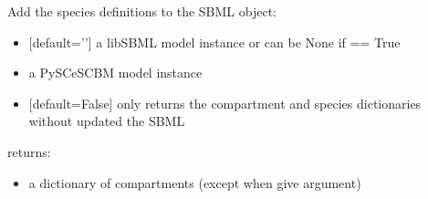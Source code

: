 \documentclass[letterpaper,10pt,english]{sphinxmanual}
\begin{document}
\begin{fulllineitems}
\label{\detokenize{modules_doc:cbmpy.CBXML.sbml_setSpeciesL2}}
\pysigstartsignatures
{}
\pysigstopsignatures
\sphinxAtStartPar
Add the species definitions to the SBML object:
\begin{itemize}
\item {} 
\sphinxAtStartPar
{} {[}default=’’{]} a libSBML model instance or can be None if  == True

\item {} 
\sphinxAtStartPar
{} a PySCeSCBM model instance

\item {} 
\sphinxAtStartPar
{} {[}default=False{]} only returns the compartment and species dictionaries without updated the SBML

\end{itemize}

\sphinxAtStartPar
returns:
\begin{itemize}
\item {} 
\sphinxAtStartPar
{} a dictionary of compartments (except when give  argument)

\end{itemize}

\end{fulllineitems}

\end{document}
